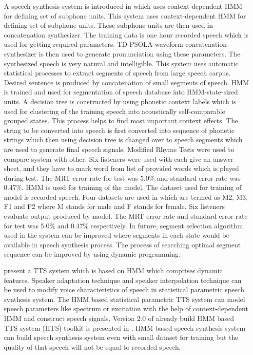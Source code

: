 A speech synthesis system is introduced in \cite{donovan1995improvements} which uses context-dependent HMM for defining set of subphone units. This system uses context-dependent HMM for defining set of subphone units. These subphone units are then used in concatenation synthesizer. The training data is one hour recorded speech which is used for getting required parameters. TD-PSOLA waveform concatenation synthesizer is then used to generate pronunciation using these parameters. The synthesized speech is very natural and intelligible. This system uses automatic statistical processes to extract segments of speech from large speech carpus. Desired sentence is produced by concatenation of small segments of speech. HMM is trained and used for segmentation of speech database into HMM-state-sized units. A decision tree is constructed by using phonetic context labels which is used for clustering of the training speech into acoustically self-comparable grouped states. This process helps to find most important context effects. The string to be converted into speech is first converted into sequence of phonetic strings which then using decision tree is changed over to speech segments which are used to generate final speech signals. Modified Rhyme Tests \cite{house1965articulation} were used to compare system with other. Six listeners were used with each give an answer sheet, and they have to mark word from list of provided words which is played during test. The MRT error rate for test was 5.0\% and standard error rate was 0.47\%. HMM is used for training of the model. The dataset used for training of model is recorded speech. Four datasets are used in which are termed as M2, M3, F1 and F2 where M stands for male and F stands for female. Six listeners evaluate output produced by model. The MRT error rate and standard error rate for test was 5.0\% and 0.47\% respectively. In future, segment selection algorithm used in the system can be improved where segments in each state would be available in speech synthesis process. The process of searching optimal segment sequence can be improved by using dynamic programming.

\cite{masuko1996speech} present a TTS system which is based on HMM which comprises dynamic features. Speaker adaptation technique \cite{tamura1998speaker} and speaker interpolation technique \cite{yoshimura2001speaker} can be used to modify voice characteristics of speech in statistical parametric speech synthesis system. The HMM based statistical parametric TTS system can model speech parameters like spectrum or excitation with the help of context-dependent HMM and construct speech signals. Version 2.0 of already build HMM based TTS system (HTS) toolkit is presented in \cite{zen2007hmm}. HMM based speech synthesis system can build speech synthesis system even with small dataset for training \cite{huang2001spoken} but the quality of that speech will not be equal to recorded speech. 

